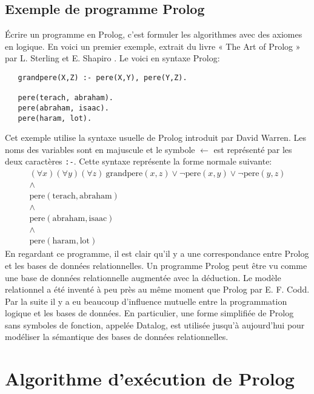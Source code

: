 \subsection{Exemple de programme Prolog}

Écrire un programme en Prolog, c'est formuler les algorithmes avec des axiomes en logique.
En voici un premier exemple, extrait du livre « The Art of Prolog » par L. Sterling et E. Shapiro \cite{pro}.
Le voici en syntaxe Prolog:
\begin{verbatim}
   grandpere(X,Z) :- pere(X,Y), pere(Y,Z).

   pere(terach, abraham).
   pere(abraham, isaac).
   pere(haram, lot).
\end{verbatim}
Cet exemple utilise la syntaxe usuelle de Prolog introduit par David Warren.
Les noms des variables sont en majuscule et
le symbole $\leftarrow$ est représenté par les deux caractères \verb+:-+.
Cette syntaxe représente la forme normale suivante:
\begin{equation}
\begin{array}{l}
(\forall x) (\forall y) (\forall z)\ \mathrm{grandpere}(x,z) \vee \neg \mathrm{pere}(x,y) \vee \neg \mathrm{pere}(y,z) \\
\wedge \\
\mathrm{pere}(\mathrm{terach},\mathrm{abraham}) \\
\wedge \\
\mathrm{pere}(\mathrm{abraham},\mathrm{isaac}) \\
\wedge \\
\mathrm{pere}(\mathrm{haram},\mathrm{lot})
\end{array}
\end{equation}
En regardant ce programme, il est clair qu'il y a une correspondance entre Prolog et les bases de données relationnelles.
Un programme Prolog peut être vu comme une base de données relationnelle augmentée avec la déduction.
Le modèle relationnel a été inventé à peu près au même moment que Prolog par E. F. Codd.
Par la suite
il y a eu beaucoup d'influence mutuelle entre la programmation logique et les bases de données.
En particulier, une forme simplifiée de Prolog sans symboles de fonction, appelée Datalog,
est utilisée jusqu'à aujourd'hui pour modéliser la sémantique
des bases de données relationnelles.

\section{Algorithme d'exécution de Prolog}

